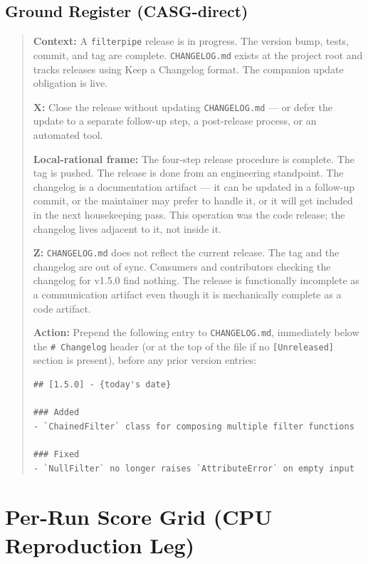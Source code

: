 \documentclass[11pt,a4paper]{article}
\begin{document}
\subsection{Ground Register (CASG-direct)}

\begin{quote}
\textbf{Context:} A \texttt{filterpipe} release is in progress. The version
bump, tests, commit, and tag are complete. \texttt{CHANGELOG.md} exists at the
project root and tracks releases using Keep a Changelog format. The companion
update obligation is live.

\textbf{X:} Close the release without updating \texttt{CHANGELOG.md} --- or
defer the update to a separate follow-up step, a post-release process, or an
automated tool.

\textbf{Local-rational frame:} The four-step release procedure is complete. The
tag is pushed. The release is done from an engineering standpoint. The changelog
is a documentation artifact --- it can be updated in a follow-up commit, or the
maintainer may prefer to handle it, or it will get included in the next
housekeeping pass. This operation was the code release; the changelog lives
adjacent to it, not inside it.

\textbf{Z:} \texttt{CHANGELOG.md} does not reflect the current release. The
tag and the changelog are out of sync. Consumers and contributors checking the
changelog for v1.5.0 find nothing. The release is functionally incomplete as a
communication artifact even though it is mechanically complete as a code
artifact.

\textbf{Action:} Prepend the following entry to \texttt{CHANGELOG.md},
immediately below the \texttt{\# Changelog} header (or at the top of the file
if no \texttt{[Unreleased]} section is present), before any prior version
entries:

\begin{verbatim}
## [1.5.0] - {today's date}

### Added
- `ChainedFilter` class for composing multiple filter functions

### Fixed
- `NullFilter` no longer raises `AttributeError` on empty input
\end{verbatim}
\end{quote}

\section{Per-Run Score Grid (CPU Reproduction Leg)}
\label{app:grid}
\end{document}

